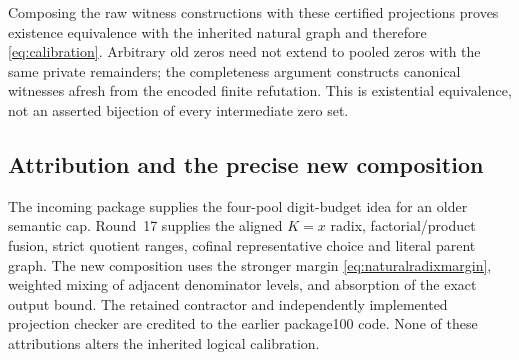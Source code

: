 Composing the raw witness constructions with these certified projections
proves existence equivalence with the inherited natural graph and therefore
\eqref{eq:calibration}. Arbitrary old zeros need not extend to pooled zeros
with the same private remainders; the completeness argument constructs
canonical witnesses afresh from the encoded finite refutation. This is
existential equivalence, not an asserted bijection of every intermediate
zero set.

\subsection{Attribution and the precise new composition}
The incoming  package supplies the
four-pool digit-budget idea for an older semantic cap. Round~17 supplies
the aligned $K=x$ radix, factorial/product fusion, strict quotient ranges,
cofinal representative choice and literal parent graph. The new composition
uses the stronger margin \eqref{eq:naturalradixmargin}, weighted mixing of
adjacent denominator levels, and absorption of the exact output bound.
The retained contractor and independently implemented projection checker
are credited to the earlier package100 code. None of these attributions
alters the inherited logical calibration.
